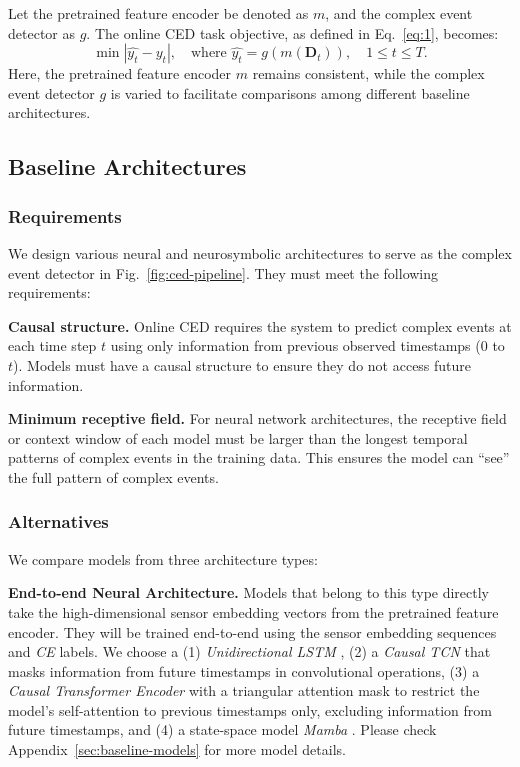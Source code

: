 Let the pretrained feature encoder be denoted as \(m\), and the complex event detector as \(g\). The online CED task objective, as defined in Eq.~\ref{eq:1}, becomes:
\begin{equation}
    \min |\hat{y_t} - y_t|, \quad \textrm{where } \hat{y_t} = g\left(m\left(\mathbf{D}_t\right)\right), \quad 1 \leq t \leq T.
\end{equation}
Here, the pretrained feature encoder \(m\) remains consistent, while the complex event detector \(g\) is varied to facilitate comparisons among different baseline architectures.

\subsection{Baseline Architectures}
\subsubsection{Requirements}
We design various neural and neurosymbolic architectures to serve as the complex event detector in Fig.~\ref{fig:ced-pipeline}. They must meet the following requirements:

\textbf{Causal structure.}
Online CED requires the system to predict complex events at each time step $t$ using only information from previous observed timestamps (0 to $t$). Models must have a causal structure to ensure they do not access future information.

\textbf{Minimum receptive field.} 
For neural network architectures, the receptive field or context window of each model must be larger than the longest temporal patterns of complex events in the training data. This ensures the model can ``see'' the full pattern of complex events.

\subsubsection{Alternatives}\label{sec:alternatives}
We compare models from three architecture types: 

\textbf{End-to-end Neural Architecture.} 
Models that belong to this type directly take the high-dimensional sensor embedding vectors from the pretrained feature encoder. They will be trained end-to-end using the sensor embedding sequences and \emph{CE} labels. We choose a (1) \emph{Unidirectional LSTM} \cite{hochreiter1997long}, (2) a \textit{Causal TCN}\cite{bai2018tcn} that masks information from future timestamps in convolutional operations, (3) a \textit{Causal Transformer Encoder} with a triangular attention mask to restrict the model's self-attention to previous timestamps only, excluding information from future timestamps, and (4) a state-space model \emph{Mamba} \cite{gu2024mamba}. Please check Appendix~\ref{sec:baseline-models} for more model details.

